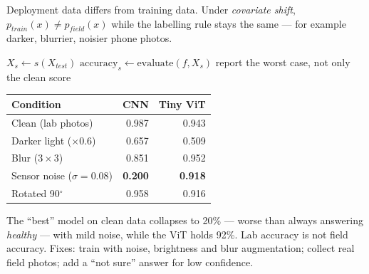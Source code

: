 \documentclass[11pt,a4paper]{article}
\begin{document}
\begin{bdef}
Deployment data differs from training data. Under \emph{covariate shift}, $p_{train}(x)\neq p_{field}(x)$ while the labelling rule stays the same --- for example darker, blurrier, noisier phone photos.
\end{bdef}
\begin{balgo}
\begin{algorithmic}[1]
  \State $X_s\gets s(X_{test})$
  \State $\text{accuracy}_s\gets\text{evaluate}(f, X_s)$
\EndFor
\State report the worst case, not only the clean score
\end{algorithmic}
\end{balgo}
\begin{bres}
\begin{tabular}{lrr}
\toprule
Condition & CNN & Tiny ViT\\
\midrule
Clean (lab photos) & 0.987 & 0.943\\
Darker light ($\times0.6$) & 0.657 & 0.509\\
Blur ($3\times3$) & 0.851 & 0.952\\
Sensor noise ($\sigma=0.08$) & \textbf{0.200} & \textbf{0.918}\\
Rotated 90$^\circ$ & 0.958 & 0.916\\
\bottomrule
\end{tabular}
\end{bres}
\begin{bwarn}
The ``best'' model on clean data collapses to 20\% --- worse than always answering \emph{healthy} --- with mild noise, while the ViT holds 92\%. Lab accuracy is not field accuracy. Fixes: train with noise, brightness and blur augmentation; collect real field photos; add a ``not sure'' answer for low confidence.
\end{bwarn}
\end{document}
